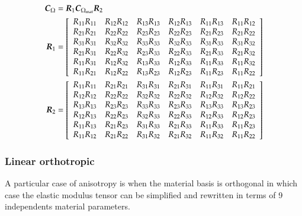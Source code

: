 \begin{align}
\boldsymbol{C}_{\Omega} &= \boldsymbol{R}_1 \boldsymbol{C}_{\Omega_{{\mathrm{mat}}}} \boldsymbol{R}_2\\
\boldsymbol{R}_1  &= \left[
  \begin{array}{cccccc}
    R_{11} R_{11} & R_{12} R_{12} & R_{13} R_{13} & R_{12} R_{13} & R_{11} R_{13} & R_{11} R_{12}\\
    R_{21} R_{21} & R_{22} R_{22} & R_{23} R_{23} & R_{22} R_{23} & R_{21} R_{23} & R_{21} R_{22}\\
    R_{31} R_{31} & R_{32} R_{32} & R_{33} R_{33} & R_{32} R_{33} & R_{31} R_{33} & R_{31} R_{32}\\
    R_{21} R_{31} & R_{22} R_{32} & R_{23} R_{33} & R_{22} R_{33} & R_{21} R_{33} & R_{21} R_{32}\\
    R_{11} R_{31} & R_{12} R_{32} & R_{13} R_{33} & R_{12} R_{33} & R_{11} R_{33} & R_{11} R_{32}\\
    R_{11} R_{21} & R_{12} R_{22} & R_{13} R_{23} & R_{12} R_{23} & R_{11} R_{23} & R_{11} R_{22}\\
  \end{array}\right]\\
\boldsymbol{R}_2  &= \left[
  \begin{array}{cccccc}
    R_{11} R_{11} & R_{21} R_{21} & R_{31} R_{31} & R_{21} R_{31} & R_{11} R_{31} & R_{11} R_{21}\\
    R_{12} R_{12} & R_{22} R_{22} & R_{32} R_{32} & R_{22} R_{32} & R_{12} R_{32} & R_{12} R_{22}\\
    R_{13} R_{13} & R_{23} R_{23} & R_{33} R_{33} & R_{23} R_{33} & R_{13} R_{33} & R_{13} R_{23}\\
    R_{12} R_{13} & R_{22} R_{23} & R_{32} R_{33} & R_{22} R_{33} & R_{12} R_{33} & R_{12} R_{23}\\
    R_{11} R_{13} & R_{21} R_{23} & R_{31} R_{33} & R_{21} R_{33} & R_{11} R_{33} & R_{11} R_{23}\\
    R_{11} R_{12} & R_{21} R_{22} & R_{31} R_{32} & R_{21} R_{32} & R_{11} R_{32} & R_{11} R_{22}\\
  \end{array}\right]\\
\end{align}

\subsubsection{Linear orthotropic}

A particular case of anisotropy is when the material basis is orthogonal in which case the elastic modulus tensor can be simplified and rewritten in terms of 9 independents material parameters.

